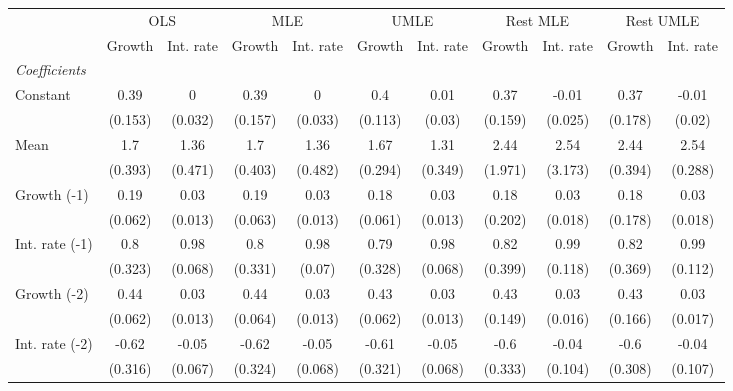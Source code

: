 \begin{table}[htbp] 
	\centering 
	\begin{tabular}{@{\extracolsep{4pt}}lcccccccccc@{}}		\hline\hline
		 		 & \multicolumn{2}{c}{OLS} &\multicolumn{2}{c}{MLE} &\multicolumn{2}{c}{UMLE} &\multicolumn{2}{c}{Rest MLE} &\multicolumn{2}{c}{Rest UMLE} \\ 
 		 & Growth 	 & Int. rate 	 & Growth 	 & Int. rate 	 & Growth 	 & Int. rate 	 & Growth 	 & Int. rate 	 & Growth 	 & Int. rate\\\cline{2-3}\cline{4-5}\cline{6-7}\cline{8-9}\cline{10-11}
\rule{0pt}{4ex} 
 \emph{Coefficients} 	  		 & 		 & 		 & 		 & 		 & 		 & 		 & 		 & 		 & 		 &\\ 
\quad Constant 	 & 0.39 	 & 0 	 & 0.39 	 & 0 	 & 0.4 	 & 0.01 	 & 0.37 	 & -0.01 	 & 0.37 	 & -0.01	 \\ 
 		 & (0.153) 	 & (0.032) 	 & (0.157) 	 & (0.033) 	 & (0.113) 	 & (0.03) 	 & (0.159) 	 & (0.025) 	 & (0.178) 	 & (0.02) 	 \\ 
\quad Mean 	 & 1.7 	 & 1.36 	 & 1.7 	 & 1.36 	 & 1.67 	 & 1.31 	 & 2.44 	 & 2.54 	 & 2.44 	 & 2.54	 \\ 
 		 & (0.393) 	 & (0.471) 	 & (0.403) 	 & (0.482) 	 & (0.294) 	 & (0.349) 	 & (1.971) 	 & (3.173) 	 & (0.394) 	 & (0.288) 	 \\ 
\quad Growth (-1) 	 &0.19 	 & 0.03 	 & 0.19 	 & 0.03 	 & 0.18 	 & 0.03 	 & 0.18 	 & 0.03 	 & 0.18 	 & 0.03	 \\ 
 		 & (0.062) 	 & (0.013) 	 & (0.063) 	 & (0.013) 	 & (0.061) 	 & (0.013) 	 & (0.202) 	 & (0.018) 	 & (0.178) 	 & (0.018) 	 \\ 
\quad Int. rate (-1) 	 &0.8 	 & 0.98 	 & 0.8 	 & 0.98 	 & 0.79 	 & 0.98 	 & 0.82 	 & 0.99 	 & 0.82 	 & 0.99	 \\ 
 		 & (0.323) 	 & (0.068) 	 & (0.331) 	 & (0.07) 	 & (0.328) 	 & (0.068) 	 & (0.399) 	 & (0.118) 	 & (0.369) 	 & (0.112) 	 \\ 
\quad Growth (-2) 	 &0.44 	 & 0.03 	 & 0.44 	 & 0.03 	 & 0.43 	 & 0.03 	 & 0.43 	 & 0.03 	 & 0.43 	 & 0.03	 \\ 
 		 & (0.062) 	 & (0.013) 	 & (0.064) 	 & (0.013) 	 & (0.062) 	 & (0.013) 	 & (0.149) 	 & (0.016) 	 & (0.166) 	 & (0.017) 	 \\ 
\quad Int. rate (-2) 	 &-0.62 	 & -0.05 	 & -0.62 	 & -0.05 	 & -0.61 	 & -0.05 	 & -0.6 	 & -0.04 	 & -0.6 	 & -0.04	 \\ 
 		 & (0.316) 	 & (0.067) 	 & (0.324) 	 & (0.068) 	 & (0.321) 	 & (0.068) 	 & (0.333) 	 & (0.104) 	 & (0.308) 	 & (0.107) 	 \\ 

\end{tabular}
\end{table}
